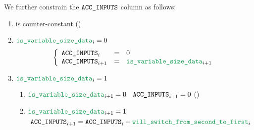 We further constrain the $\texttt{ACC\_INPUTS}$ column as follows:
\begin{enumerate}
    \item \accInputs{} is counter-constant \quad (\trash)
    \item \If $\locIsVariableSizeData_{i} = 0$ ~\Then
        \[
            \left\{ \begin{array}{lcl}
                \accInputs_{i}     & = & 0                            \\
                \accInputs_{i + 1} & = & \locIsVariableSizeData_{i + 1} \\
            \end{array} \right.
        \]
    \item \If $\locIsVariableSizeData_{i} = 1$ \Then 
        \begin{enumerate}
            \item \If $\locIsVariableSizeData _{i + 1} = 0$ ~\Then $\texttt{ACC\_INPUTS}_{i + 1} = 0$ \quad (\sanityCheck)
            \item \If $\locIsVariableSizeData _{i + 1} = 1$ ~\Then
                \[
                    \accInputs _{i + 1} = \accInputs _{i} + \locWillSwitchFromSecondToFirst _{i}
                \]
        \end{enumerate}
\end{enumerate}
